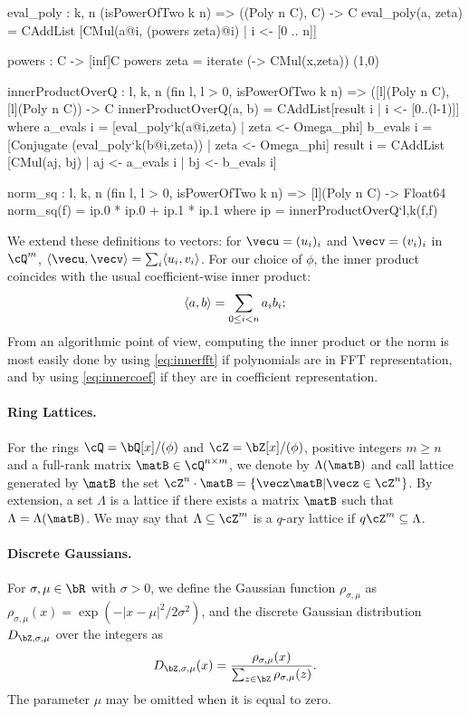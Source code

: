 \begin{code}
  eval_poly : {k, n} (isPowerOfTwo k n) => ((Poly n C), C) -> C
  eval_poly(a, zeta) = CAddList [CMul(a@i, (powers zeta)@i) | i <- [0 .. n]]

  powers : C -> [inf]C
  powers zeta = iterate (\x -> CMul(x,zeta)) (1,0)

  innerProductOverQ : {l, k, n} (fin l, l > 0, isPowerOfTwo k n) =>
    ([l](Poly n C), [l](Poly n C)) -> C 
  innerProductOverQ(a, b) = CAddList[result i | i <- [0..(l-1)]] where
    a_evals i = [eval_poly`{k}(a@i,zeta) | zeta <- Omega_phi]
    b_evals i = [Conjugate (eval_poly`{k}(b@i,zeta)) | zeta <- Omega_phi]
    result i = CAddList [CMul(aj, bj) | aj <- a_evals i | bj <- b_evals i]

  norm_sq : {l, k, n} (fin l, l > 0, isPowerOfTwo k n) =>
    [l](Poly n C) -> Float64
  norm_sq(f) = ip.0 * ip.0 + ip.1 * ip.1
    where ip = innerProductOverQ`{l,k}(f,f)
\end{code}

We extend these definitions to vectors: for $\vecu = (u_i)_i$ and $\vecv = (v_i)_i$ in $\cQ^{m}$, $\inner{\vecu}{\vecv} = \sum_i \inner{u_i}{v_i}$.
For our choice of $\phi$, the inner product coincides with the usual coefficient-wise inner product: 
\begin{equation}\label{eq:innercoef}
\langle a, b \rangle = \sum_{0 \leq i < n} a_i b_i; 
\end{equation}
From an algorithmic point of view, computing the inner product or the norm is most easily done by using \eqref{eq:innerfft} if polynomials are in FFT representation, and by using \eqref{eq:innercoef} if they are in coefficient representation.

\paragraph{Ring Lattices.} For the rings $\cQ = \bQ[x]/(\phi)$ and $\cZ = \bZ[x]/(\phi)$, positive integers $m \geq n$ and a full-rank matrix $\matB \in \cQ^{n\times m}$, we denote by $\Lambda(\matB)$ and call lattice generated by $\matB$ the set $\cZ^n \cdot \matB = \{ \vecz \matB | \vecz \in \cZ^{n}\}$. By extension, a set $\Lambda$ is a lattice if there exists a matrix $\matB$ such that $\Lambda = \Lambda(\matB)$. We may say that $\Lambda \subseteq \cZ^m$ is a $q$-ary lattice if $ q\cZ^m \subseteq \Lambda$.

\paragraph{Discrete Gaussians.} For $\sigma, \mu\in \bR$ with $\sigma >0$, we define the Gaussian function $\rho_{\sigma,\mu}$ as $\rho_{\sigma,\mu}(x) = \exp(-|x-\mu|^2/2\sigma^2)$, and the discrete Gaussian distribution $D_{\bZ,\sigma,\mu}$ over the integers as 
\begin{equation} 
D_{\bZ,\sigma,\mu}(x) = \frac{\rho_{\sigma,\mu}(x)}{ \sum_{z \in \bZ} \rho_{\sigma,\mu}(z) } .
\end{equation}
The parameter $\mu$ may be omitted when it is equal to zero.


